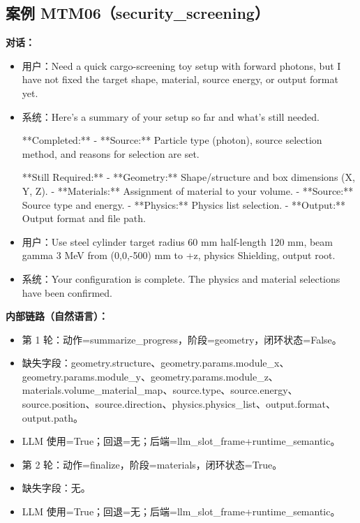 \documentclass[11pt]{ctexart}
\begin{document}
\subsection{案例 MTM06（security\_screening）}
\textbf{对话：}
\begin{itemize}
\item 用户：Need a quick cargo-screening toy setup with forward photons, but I have not fixed the target shape, material, source energy, or output format yet.
\item 系统：Here's a summary of your setup so far and what's still needed.

**Completed:**
- **Source:** Particle type (photon), source selection method, and reasons for selection are set.

**Still Required:**
- **Geometry:** Shape/structure and box dimensions (X, Y, Z).
- **Materials:** Assignment of material to your volume.
- **Source:** Source type and energy.
- **Physics:** Physics list selection.
- **Output:** Output format and file path.
\item 用户：Use steel cylinder target radius 60 mm half-length 120 mm, beam gamma 3 MeV from (0,0,-500) mm to +z, physics Shielding, output root.
\item 系统：Your configuration is complete. The physics and material selections have been confirmed.
\end{itemize}
\textbf{内部链路（自然语言）：}
\begin{itemize}
\item 第 1 轮：动作=summarize\_progress，阶段=geometry，闭环状态=False。
\item 缺失字段：geometry.structure、geometry.params.module\_x、geometry.params.module\_y、geometry.params.module\_z、materials.volume\_material\_map、source.type、source.energy、source.position、source.direction、physics.physics\_list、output.format、output.path。
\item LLM 使用=True；回退=无；后端=llm\_slot\_frame+runtime\_semantic。
\item 第 2 轮：动作=finalize，阶段=materials，闭环状态=True。
\item 缺失字段：无。
\item LLM 使用=True；回退=无；后端=llm\_slot\_frame+runtime\_semantic。
\end{itemize}
\end{document}
